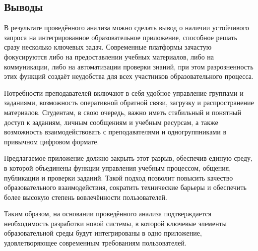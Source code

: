 \subsection*{Выводы}

В результате проведённого анализа можно сделать вывод о наличии устойчивого запроса на интегрированное образовательное приложение, способное решать сразу несколько ключевых задач. Современные платформы зачастую фокусируются либо на предоставлении учебных материалов, либо на коммуникации, либо на автоматизации проверки знаний, при этом разрозненность этих функций создаёт неудобства для всех участников образовательного процесса.

Потребности преподавателей включают в себя удобное управление группами и заданиями, возможность оперативной обратной связи, загрузку и распространение материалов. Студентам, в свою очередь, важно иметь стабильный и понятный доступ к заданиям, личным сообщениям и учебным ресурсам, а также возможность взаимодействовать с преподавателями и одногруппниками в привычном цифровом формате.

Предлагаемое приложение должно закрыть этот разрыв, обеспечив единую среду, в которой объединены функции управления учебным процессом, общения, публикации и проверки заданий. Такой подход позволит повысить качество образовательного взаимодействия, сократить технические барьеры и обеспечить более высокую степень вовлечённости пользователей.

Таким образом, на основании проведённого анализа подтверждается необходимость разработки новой системы, в которой ключевые элементы образовательной среды будут интегрированы в одно приложение, удовлетворяющее современным требованиям пользователей.
